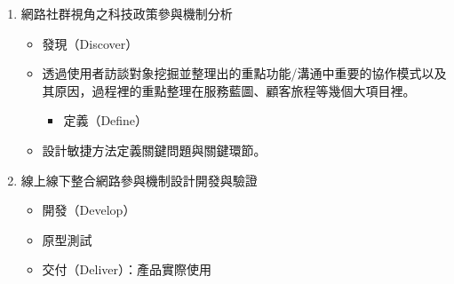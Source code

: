 \documentclass[12pt,a4paper]{article}
\begin{document}
\begin{enumerate}
\item 網路社群視角之科技政策參與機制分析
\begin{itemize}
\item 發現（Discover）
\item 透過使用者訪談對象挖掘並整理出的重點功能/溝通中重要的協作模式以及其原因，過程裡的重點整理在服務藍圖、顧客旅程等幾個大項目裡。
\begin{itemize}
\item 定義（Define）
\end{itemize}
\item 設計敏捷方法定義關鍵問題與關鍵環節。
\end{itemize}
\item 線上線下整合網路參與機制設計開發與驗證
\begin{itemize}
\item 開發（Develop）
\item 原型測試
\item 交付（Deliver）：產品實際使用
\end{itemize}
\end{enumerate}
\end{document}
